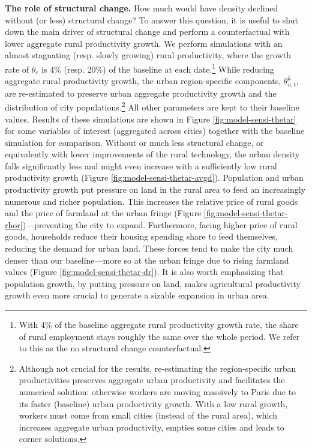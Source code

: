 \documentclass[./20250130-paper.tex]{subfiles}
\begin{document}
\textbf{The role of structural change.} How much would have density declined without (or less) structural change? To answer this question, it is useful to shut down the main driver of structural change and perform a counterfactual with lower aggregate rural productivity growth. We perform simulations with an almost stagnating (resp. slowly growing) rural productivity, where the growth rate of $\theta_r$ is 4\% (resp. 20\%) of the baseline at each date.\footnote{With 4\% of the baseline aggregate rural productivity growth rate, the share of rural employment stays roughly the same over the whole period. We refer to this as the no structural change counterfactual.} While reducing aggregate rural productivity growth, the urban region-specific components, $\theta^k_{u,t}$, are re-estimated to preserve urban aggregate productivity growth and the distribution of city populations.\footnote{Although not crucial for the results, re-estimating the region-specific urban productivities preserves aggregate urban productivity and facilitates the numerical solution: otherwise workers are moving massively to Paris due to its faster (baseline) urban productivity growth. With a low rural growth, workers must come from small cities (instead of the rural area), which increases aggregate urban productivity, empties some cities and leads to corner solutions.}  All other parameters are kept to their baseline values. Results of these simulations are shown in Figure \ref{fig:model-sensi-thetar} for some variables of interest (aggregated across cities) together with the baseline simulation for comparison. Without or much less structural change, or equivalently with lower improvements of the rural technology, the urban density falls significantly less and might even increase with a sufficiently low rural productivity growth (Figure \ref{fig:model-sensi-thetar-avgd}). Population and urban productivity growth put pressure on land in the rural area to feed an increasingly numerous and richer population. This increases the relative price of rural goods and the price of farmland at the urban fringe (Figure \ref{fig:model-sensi-thetar-rhor})---preventing the city to expand. Furthermore, facing higher price of rural goods, households reduce their housing spending share to feed themselves, reducing the demand for urban land. These forces tend to make the city much denser than our baseline---more so at the urban fringe due to rising farmland values (Figure \ref{fig:model-sensi-thetar-dr}). It is also worth emphasizing that population growth, by putting pressure on land, makes agricultural productivity growth even more crucial to generate a sizable expansion in urban area. 
\end{document}
